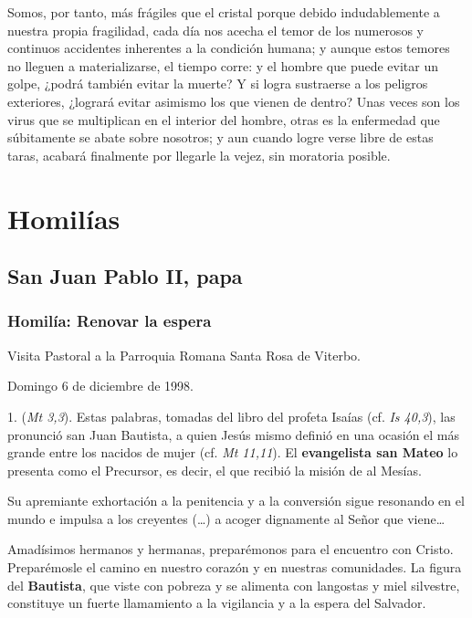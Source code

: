 Somos, por tanto, más frágiles que el cristal porque debido indudablemente a nuestra propia fragilidad, cada día nos acecha el temor de los numerosos y continuos accidentes inherentes a la condición humana; y aunque estos temores no lleguen a materializarse, el tiempo corre: y el hombre que puede evitar un golpe, ¿podrá también evitar la muerte? Y si logra sustraerse a los peligros exteriores, ¿logrará evitar asimismo los que vienen de dentro? Unas veces son los virus que se multiplican en el interior del hombre, otras es la enfermedad que súbitamente se abate sobre nosotros; y aun cuando logre verse libre de estas taras, acabará finalmente por llegarle la vejez, sin moratoria posible.

\section{Homilías}

\subsection{San Juan Pablo II, papa}

\subsubsection{Homilía: Renovar la espera}

Visita Pastoral a la Parroquia Romana Santa Rosa de Viterbo.

Domingo 6 de diciembre de 1998.

1.  (\emph{Mt 3,3}). Estas palabras, tomadas del libro del profeta Isaías (cf. \emph{Is 40,3}), las pronunció san Juan Bautista, a quien Jesús mismo definió en una ocasión el más grande entre los nacidos de mujer (cf. \emph{Mt 11,11}). El \textbf{evangelista san Mateo} lo presenta como el Precursor, es decir, el que recibió la misión de  al Mesías.

Su apremiante exhortación a la penitencia y a la conversión sigue resonando en el mundo e impulsa a los creyentes (\ldots{}) a acoger dignamente al Señor que viene\ldots{}

Amadísimos hermanos y hermanas, preparémonos para el encuentro con Cristo. Preparémosle el camino en nuestro corazón y en nuestras comunidades. La figura del \textbf{Bautista}, que viste con pobreza y se alimenta con langostas y miel silvestre, constituye un fuerte llamamiento a la vigilancia y a la espera del Salvador.

